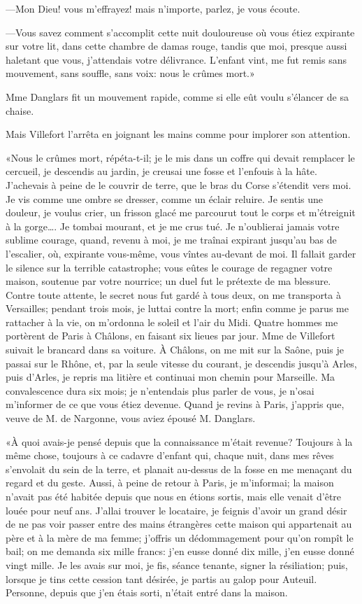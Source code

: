 —Mon Dieu! vous m'effrayez! mais n'importe, parlez, je vous écoute. 

—Vous savez comment s'accomplit cette nuit douloureuse où vous étiez expirante sur votre lit, dans cette chambre de damas rouge, tandis que moi, presque aussi haletant que vous, j'attendais votre délivrance. L'enfant vint, me fut remis sans mouvement, sans souffle, sans voix: nous le crûmes mort.» 

Mme Danglars fit un mouvement rapide, comme si elle eût voulu s'élancer de sa chaise. 

Mais Villefort l'arrêta en joignant les mains comme pour implorer son attention. 

«Nous le crûmes mort, répéta-t-il; je le mis dans un coffre qui devait remplacer le cercueil, je descendis au jardin, je creusai une fosse et l'enfouis à la hâte. J'achevais à peine de le couvrir de terre, que le bras du Corse s'étendit vers moi. Je vis comme une ombre se dresser, comme un éclair reluire. Je sentis une douleur, je voulus crier, un frisson glacé me parcourut tout le corps et m'étreignit à la gorge\dots. Je tombai mourant, et je me crus tué. Je n'oublierai jamais votre sublime courage, quand, revenu à moi, je me traînai expirant jusqu'au bas de l'escalier, où, expirante vous-même, vous vîntes au-devant de moi. Il fallait garder le silence sur la terrible catastrophe; vous eûtes le courage de regagner votre maison, soutenue par votre nourrice; un duel fut le prétexte de ma blessure. Contre toute attente, le secret nous fut gardé à tous deux, on me transporta à Versailles; pendant trois mois, je luttai contre la mort; enfin comme je parus me rattacher à la vie, on m'ordonna le soleil et l'air du Midi. Quatre hommes me portèrent de Paris à Châlons, en faisant six lieues par jour. Mme de Villefort suivait le brancard dans sa voiture. À Châlons, on me mit sur la Saône, puis je passai sur le Rhône, et, par la seule vitesse du courant, je descendis jusqu'à Arles, puis d'Arles, je repris ma litière et continuai mon chemin pour Marseille. Ma convalescence dura six mois; je n'entendais plus parler de vous, je n'osai m'informer de ce que vous étiez devenue. Quand je revins à Paris, j'appris que, veuve de M. de Nargonne, vous aviez épousé M. Danglars. 

«À quoi avais-je pensé depuis que la connaissance m'était revenue? Toujours à la même chose, toujours à ce cadavre d'enfant qui, chaque nuit, dans mes rêves s'envolait du sein de la terre, et planait au-dessus de la fosse en me menaçant du regard et du geste. Aussi, à peine de retour à Paris, je m'informai; la maison n'avait pas été habitée depuis que nous en étions sortis, mais elle venait d'être louée pour neuf ans. J'allai trouver le locataire, je feignis d'avoir un grand désir de ne pas voir passer entre des mains étrangères cette maison qui appartenait au père et à la mère de ma femme; j'offris un dédommagement pour qu'on rompît le bail; on me demanda six mille francs: j'en eusse donné dix mille, j'en eusse donné vingt mille. Je les avais sur moi, je fis, séance tenante, signer la résiliation; puis, lorsque je tins cette cession tant désirée, je partis au galop pour Auteuil. Personne, depuis que j'en étais sorti, n'était entré dans la maison. 

